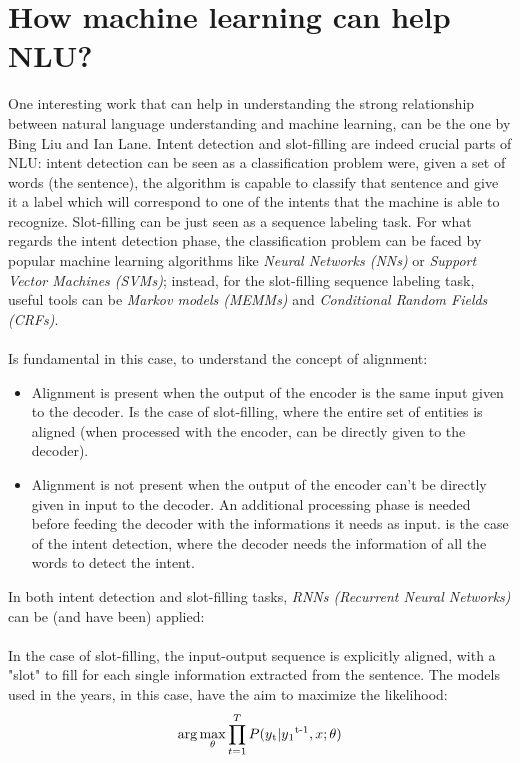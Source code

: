 \documentclass[a4paper,12pt]{report}
\begin{document}
	\section{How machine learning can help NLU?}
	One interesting work that can help in understanding the strong relationship between natural language understanding and machine learning, can be the one by Bing Liu and Ian Lane\cite{rnn}. Intent detection and slot-filling are indeed crucial parts of NLU: intent detection can be seen as a classification problem were, given a set of words (the sentence), the algorithm is capable to classify that sentence and give it a label which will correspond to one of the intents that the machine is able to recognize. Slot-filling can be just seen as a sequence labeling task. For what regards the intent detection phase, the classification problem can be faced by popular machine learning algorithms like \textit{Neural Networks (NNs)} or \textit{Support Vector Machines (SVMs)}; instead, for the slot-filling sequence labeling task, useful tools can be \textit{Markov models (MEMMs)} and \textit{Conditional Random Fields (CRFs)}.\\\\
	Is fundamental in this case, to understand the concept of alignment:
	\begin{itemize}
		\item Alignment is present when the output of the encoder is the same input given to the decoder. Is the case of slot-filling, where the entire set of entities is aligned (when processed with the encoder, can be directly given to the decoder).
		
		\item Alignment is not present when the output of the encoder can't be directly given in input to the decoder. An additional processing phase is needed before feeding the decoder with the informations it needs as input. is the case of the intent detection, where the decoder needs the information of all the words to detect the intent.
	\end{itemize}
	In both intent detection and slot-filling tasks, \textit{RNNs (Recurrent Neural Networks)} can be (and have been) applied:\\\\
	In the case of slot-filling, the input-output sequence is explicitly aligned, with a "slot" to fill for each single information extracted from the sentence. The models used in the years, in this case, have the aim to maximize the likelihood:
	\begin{equation}
	\arg \max_{\theta} \prod_{t=1}^{T} P(y\textsubscript{t}|y\textsubscript{1}\textsuperscript{t-1},x;\theta)
	\end{equation}
\end{document}
